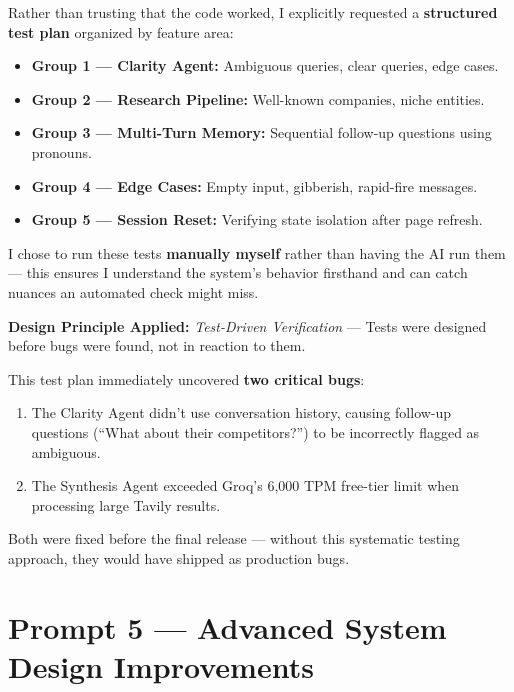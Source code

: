 \documentclass[12pt, a4paper]{article}
\begin{document}
\begin{reasonbox}
Rather than trusting that the code worked, I explicitly requested a \textbf{structured test plan} organized by feature area:

\begin{itemize}[leftmargin=1.5em]
    \item \textbf{Group 1 — Clarity Agent:} Ambiguous queries, clear queries, edge cases.
    \item \textbf{Group 2 — Research Pipeline:} Well-known companies, niche entities.
    \item \textbf{Group 3 — Multi-Turn Memory:} Sequential follow-up questions using pronouns.
    \item \textbf{Group 4 — Edge Cases:} Empty input, gibberish, rapid-fire messages.
    \item \textbf{Group 5 — Session Reset:} Verifying state isolation after page refresh.
\end{itemize}

I chose to run these tests \textbf{manually myself} rather than having the AI run them — this ensures I understand the system's behavior firsthand and can catch nuances an automated check might miss.

\textbf{Design Principle Applied:} \textit{Test-Driven Verification} — Tests were designed before bugs were found, not in reaction to them.
\end{reasonbox}

\begin{impactbox}
This test plan immediately uncovered \textbf{two critical bugs}:
\begin{enumerate}
    \item The Clarity Agent didn't use conversation history, causing follow-up questions (``What about their competitors?'') to be incorrectly flagged as ambiguous.
    \item The Synthesis Agent exceeded Groq's 6,000 TPM free-tier limit when processing large Tavily results.
\end{enumerate}
Both were fixed before the final release — without this systematic testing approach, they would have shipped as production bugs.
\end{impactbox}

\section{Prompt 5 — Advanced System Design Improvements}
\end{document}
